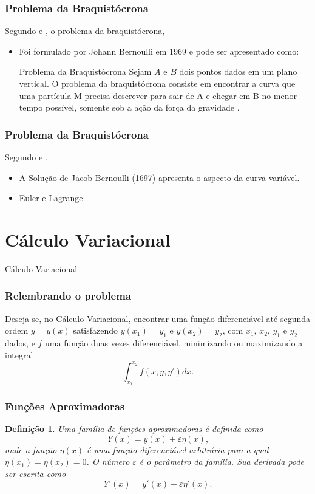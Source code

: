 \documentclass{beamer}
\newtheorem{definicao}{Definição}
\newcommand{\makesubtitleframe}[1]{
	{
		\usebackgroundtemplate{\texttt{[image: ueg\_background\_title]}}
		\begin{frame}
			\vfill
			\begin{center}
				{\Huge\usebeamercolor[white]{}#1}
			\end{center}
			\vfill
		\end{frame}
	}
}
\begin{document}
\begin{frame}
	\frametitle{Problema da Braquistócrona}
	\justify
	
	Segundo  e , o problema da braquistócrona,
	\begin{itemize}
		\item Foi formulado por Johann Bernoulli em 1969 e pode ser apresentado como:
		\begin{block}{Problema da Braquistócrona}
			Sejam $A$ e $B$ dois pontos dados em um plano vertical. O problema da braquistócrona consiste em encontrar a curva que uma partícula M precisa descrever para sair de A e chegar em B no menor tempo possível, somente sob a ação da força da gravidade \cite[p. 3]{calcvar}.
		\end{block}
	\end{itemize}
\end{frame}

\begin{frame}
	\frametitle{Problema da Braquistócrona}
	\justify

	Segundo  e ,
	\begin{itemize}
		\item A Solução de Jacob Bernoulli (1697) apresenta o aspecto da curva variável.
		\pause
		
		\item Euler e Lagrange.
	\end{itemize}
\end{frame}

\section{Cálculo Variacional}
\makesubtitleframe{Cálculo Variacional}

\begin{frame}
	\frametitle{Relembrando o problema}
	\justify
	
	Deseja-se, no Cálculo Variacional, encontrar uma função diferenciável até segunda ordem $y=y(x)$ satisfazendo $y(x_1)=y_1$ e $y(x_2)=y_2$, com $x_1$, $x_2$, $y_1$ e $y_2$ dados, e $f$ uma função duas vezes diferenciável, minimizando ou maximizando a integral
	\begin{equation}
		\int_{x_1}^{x_2} f(x,y,y')dx\text{.}
		\label{eqn:def_calcvar}
	\end{equation}
\end{frame}

\begin{frame}
	\frametitle{Funções Aproximadoras}
	\begin{definicao}
		\justify
		Uma família de funções aproximadoras é definida como
		$$Y(x)=y(x)+\varepsilon \eta (x)\text{,}$$
		onde a função $\eta (x)$ é uma função diferenciável arbitrária para a qual $\eta (x_1)=\eta (x_2)=0$. O número $\varepsilon$ é o parâmetro da família. Sua derivada pode ser escrita como
		$$Y'(x)=y'(x)+\varepsilon \eta '(x)\text{.}$$
	\end{definicao}
\end{frame}
\end{document}
